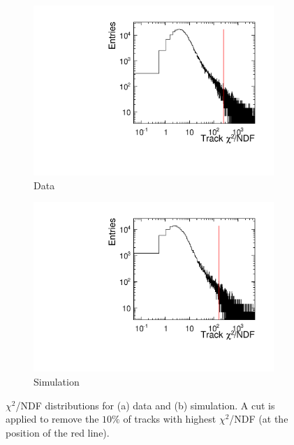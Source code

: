 \begin{figure}[htbp] \centering
  \begin{subfigure}[b]{0.45\textwidth}
    \includegraphics[width=\textwidth]{figures/Telescope/biasedResiduals/chi2_run661.pdf}
    \caption{Data}
  \end{subfigure}\hfill
  \begin{subfigure}[b]{0.45\textwidth}
    \includegraphics[width=\textwidth]{figures/Telescope/biasedResiduals/chi2_run77.pdf}
    \caption{Simulation}
  \end{subfigure}
  \caption{$\chi^2$/NDF distributions for (a) data and (b)
    simulation. A cut is applied to remove the $10\%$ of tracks with
    highest $\chi^2$/NDF (at the position of the red line).}
  \label{fig:chi2_data_simu}
\end{figure}

